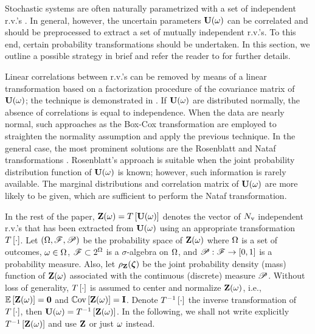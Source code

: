 Stochastic systems are often naturally parametrized with a set of independent r.v.'s \cite{xiu2009}. In general, however, the uncertain parameters $\mathbf{U}(\omega)$ can be correlated and should be preprocessed to extract a set of mutually independent r.v.'s. To this end, certain probability transformations should be undertaken. In this section, we outline a possible strategy in brief and refer the reader to \cite{xiu2009, eldred2009} for further details.

Linear correlations between r.v.'s can be removed by means of a linear transformation based on a factorization procedure of the covariance matrix of $\mathbf{U}(\omega)$; the technique is demonstrated in . If $\mathbf{U}(\omega)$ are distributed normally, the absence of correlations is equal to independence. When the data are nearly normal, such approaches as the Box-Cox transformation are employed to straighten the normality assumption and apply the previous technique. In the general case, the most prominent solutions are the Rosenblatt and Nataf transformations \cite{eldred2009}. Rosenblatt's approach is suitable when the joint probability distribution function of $\mathbf{U}(\omega)$ is known; however, such information is rarely available. The marginal distributions and correlation matrix of $\mathbf{U}(\omega)$ are more likely to be given, which are sufficient to perform the Nataf transformation.

In the rest of the paper, $\mathbf{Z}(\omega) = T\left[\mathbf{U}(\omega)\right]$ denotes the vector of ${N_\text{v}}$ independent r.v.'s that has been extracted from $\mathbf{U}(\omega)$ using an appropriate transformation $T\left[\cdot\right]$. Let $(\Omega, \mathscr{F}, \mathscr{P})$ be the probability space \cite{durrett2010} of $\mathbf{Z}(\omega)$ where $\Omega$ is a set of outcomes, $\omega \in \Omega$, $\mathscr{F} \subset 2^\Omega$ is a $\sigma$-algebra on $\Omega$, and $\mathscr{P}: \mathscr{F} \to [0, 1]$ is a probability measure. Also, let $\rho_{\mathbf{Z}}(\boldsymbol{\zeta})$ be the joint probability density (mass) function of $\mathbf{Z}(\omega)$ associated with the continuous (discrete) measure $\mathscr{P}$. Without loss of generality, $T\left[\cdot\right]$ is assumed to center and normalize $\mathbf{Z}(\omega)$, i.e., $\oExp{\vZ(\o)} = \mZero$ and $\oCov{\vZ(\o)} = \mI$. Denote $T^{-1}\left[\cdot\right]$ the inverse transformation of $T\left[\cdot\right]$, then $\mathbf{U}(\omega) = T^{-1}\left[\mathbf{Z}(\omega)\right]$. In the following, we shall not write explicitly $T^{-1}\left[\mathbf{Z}(\omega)\right]$ and use $\mathbf{Z}$ or just $\omega$ instead.
